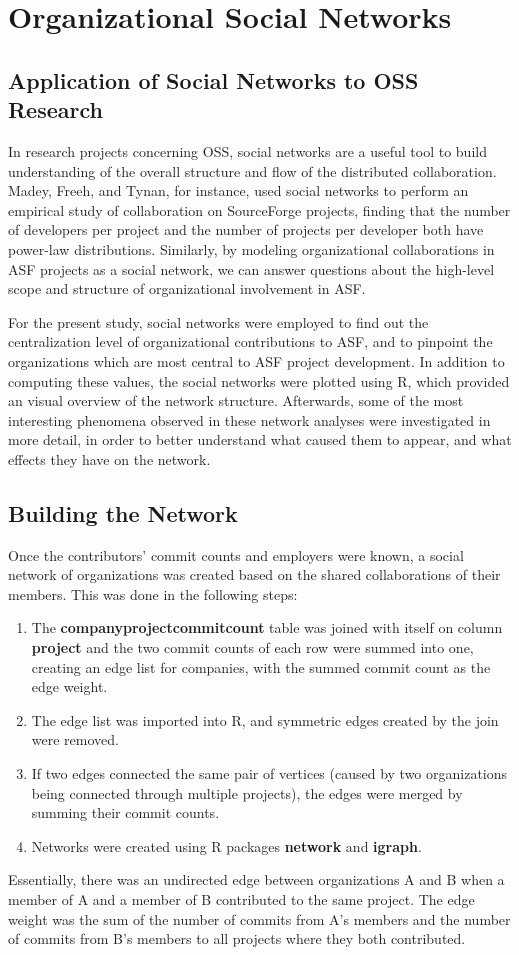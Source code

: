 \chapter{Organizational Social Networks}
\section{Application of Social Networks to OSS Research}
In research projects concerning OSS, social networks are a useful tool to build understanding of the overall structure and flow of the distributed collaboration. Madey, Freeh, and Tynan\cite{madey2002open}, for instance, used social networks to perform an empirical study of collaboration on SourceForge projects, finding that the number of developers per project and the number of projects per developer both have power-law distributions. Similarly, by modeling organizational collaborations in ASF projects as a social network, we can answer questions about the high-level scope and structure of organizational involvement in ASF.

For the present study, social networks were employed to find out the centralization level of organizational contributions to ASF, and to pinpoint the organizations which are most central to ASF project development. In addition to computing these values, the social networks were plotted using R, which provided an visual overview of the network structure. Afterwards, some of the most interesting phenomena observed in these network analyses were investigated in more detail, in order to better understand what caused them to appear, and what effects they have on the network.
\section{Building the Network}
Once the contributors' commit counts and employers were known, a social network of organizations was created based on the shared collaborations of their members. This was done in the following steps:
\begin{enumerate}
	\item The \textbf{companyprojectcommitcount} table was joined with itself on column \textbf{project} and the two commit counts of each row were summed into one, creating an edge list for companies, with the summed commit count as the edge weight.
	\item The edge list was imported into R, and symmetric edges created by the join were removed.
	\item If two edges connected the same pair of vertices (caused by two organizations being connected through multiple projects), the edges were merged by summing their commit counts.  
	\item Networks were created using R packages \textbf{network} and \textbf{igraph}.
\end{enumerate}
Essentially, there was an undirected edge between organizations A and B when a member of A and a member of B contributed to the same project. The edge weight was the sum of the number of commits from A's members and the number of commits from B's members to all projects where they both contributed.


